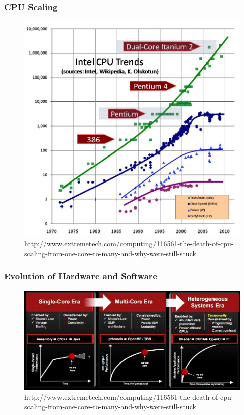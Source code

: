 \documentclass[12pt]{beamer}
\begin{document}
\begin{frame}
\frametitle{CPU Scaling}
\begin{figure}
\includegraphics[height=0.75\textheight]{img/cpuscaling}
\caption{http://www.extremetech.com/computing/116561-the-death-of-cpu-scaling-from-one-core-to-many-and-why-were-still-stuck}
\end{figure}
\end{frame}

\begin{frame}
\frametitle{Evolution of Hardware and Software}
\begin{figure}
\includegraphics[width=\textwidth]{img/amdscaling}
\caption{http://www.extremetech.com/computing/116561-the-death-of-cpu-scaling-from-one-core-to-many-and-why-were-still-stuck}
\end{figure}
\end{frame}
\end{document}
